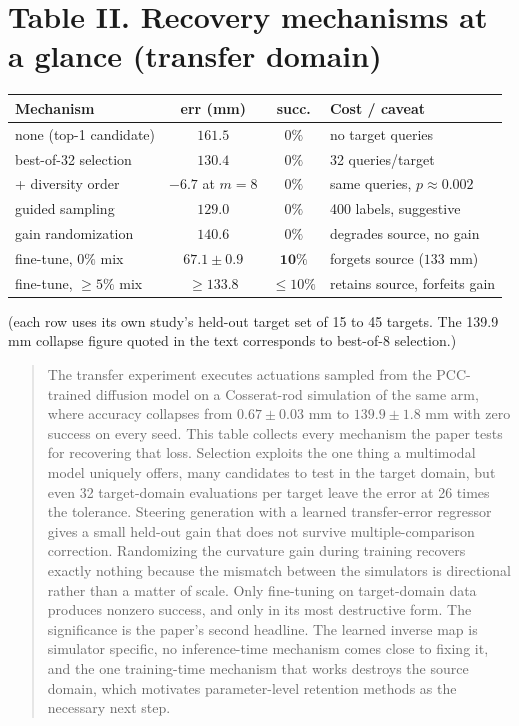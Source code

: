 \documentclass[11pt]{article}
\newcommand{\desc}[1]{\begin{quote}\small #1\end{quote}}
\begin{document}
\section*{Table II. Recovery mechanisms at a glance (transfer domain)}

\begin{center}
\begin{tabular}{lccl}
\toprule
Mechanism & err (mm) & succ. & Cost / caveat \\
\midrule
none (top-1 candidate) & $161.5$ & $0\%$ & no target queries \\
best-of-32 selection & $130.4$ & $0\%$ & 32 queries/target \\
\; + diversity order & $-6.7$ at $m{=}8$ & $0\%$ & same queries, $p{\approx}0.002$ \\
guided sampling & $129.0$ & $0\%$ & 400 labels, suggestive \\
gain randomization & $140.6$ & $0\%$ & degrades source, no gain \\
fine-tune, $0\%$ mix & $\mathbf{67.1\pm0.9}$ & $\mathbf{10\%}$ & forgets source ($133$ mm) \\
fine-tune, $\geq 5\%$ mix & $\geq 133.8$ & $\leq 10\%$ & retains source, forfeits gain \\
\bottomrule
\end{tabular}

{\small (each row uses its own study's held-out target set of 15 to 45
targets. The 139.9 mm collapse figure quoted in the text corresponds to
best-of-8 selection.)}
\end{center}

\desc{The transfer experiment executes actuations sampled from the
PCC-trained diffusion model on a Cosserat-rod simulation of the same arm,
where accuracy collapses from $0.67\pm0.03$ mm to $139.9\pm1.8$ mm with zero
success on every seed. This table collects every mechanism the paper tests
for recovering that loss. Selection exploits the one thing a multimodal
model uniquely offers, many candidates to test in the target domain, but
even 32 target-domain evaluations per target leave the error at 26 times the
tolerance. Steering generation with a learned transfer-error regressor gives
a small held-out gain that does not survive multiple-comparison correction.
Randomizing the curvature gain during training recovers exactly nothing
because the mismatch between the simulators is directional rather than a
matter of scale. Only fine-tuning on target-domain data produces nonzero
success, and only in its most destructive form. The significance is the
paper's second headline. The learned inverse map is simulator specific, no
inference-time mechanism comes close to fixing it, and the one training-time
mechanism that works destroys the source domain, which motivates
parameter-level retention methods as the necessary next step.}
\end{document}
